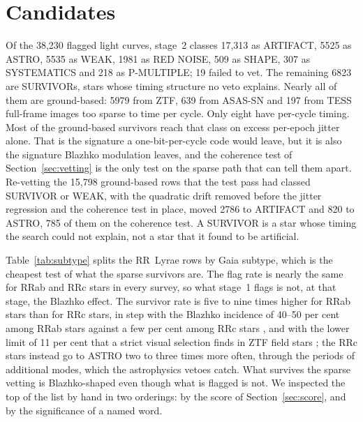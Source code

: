 \documentclass[final,5p]{elsarticle}
\begin{document}
\section{Candidates}
\label{sec:candidates}

Of the 38{,}230 flagged light curves, stage~2 classes 17{,}313 as ARTIFACT, 5525 as ASTRO, 5535 as WEAK, 1981 as RED NOISE, 509 as SHAPE, 307 as SYSTEMATICS and 218 as P-MULTIPLE; 19 failed to vet. The remaining 6823 are SURVIVORs, stars whose timing structure no veto explains. Nearly all of them are ground-based: 5979 from ZTF, 639 from ASAS-SN and 197 from TESS full-frame images too sparse to time per cycle. Only eight have per-cycle timing. Most of the ground-based survivors reach that class on excess per-epoch jitter alone. That is the signature a one-bit-per-cycle code would leave, but it is also the signature Blazhko modulation leaves, and the coherence test of Section~\ref{sec:vetting} is the only test on the sparse path that can tell them apart. Re-vetting the 15{,}798 ground-based rows that the test pass had classed SURVIVOR or WEAK, with the quadratic drift removed before the jitter regression and the coherence test in place, moved 2786 to ARTIFACT and 820 to ASTRO, 785 of them on the coherence test. A SURVIVOR is a star whose timing the search could not explain, not a star that it found to be artificial.

Table~\ref{tab:subtype} splits the RR~Lyrae rows by Gaia subtype, which is the cheapest test of what the sparse survivors are. The flag rate is nearly the same for RRab and RRc stars in every survey, so what stage~1 flags is not, at that stage, the Blazhko effect. The survivor rate is five to nine times higher for RRab stars than for RRc stars, in step with the Blazhko incidence of 40--50 per cent among RRab stars \citep{Prudil2017, Kovacs2020, Skarka2020} against a few per cent among RRc stars \citep{Netzel2018}, and with the lower limit of 11 per cent that a strict visual selection finds in ZTF field stars \citep{Donev2025}; the RRc stars instead go to ASTRO two to three times more often, through the periods of additional modes, which the astrophysics vetoes catch. What survives the sparse vetting is Blazhko-shaped even though what is flagged is not. We inspected the top of the list by hand in two orderings: by the score of Section~\ref{sec:score}, and by the significance of a named word.
\end{document}
